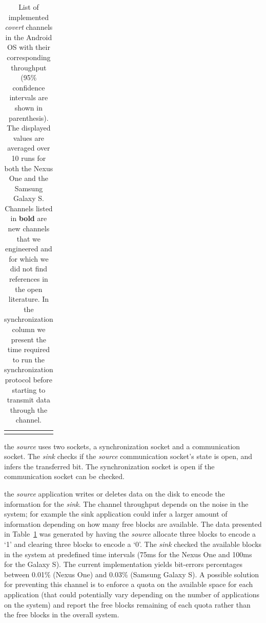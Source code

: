 \begin{landscape}
\begin{table}[!ht]
{\begin{tabular}{|l|rl|rl|rl|rl|}
      \multicolumn{9}{l}{} %
    \end{tabular}}

  \caption[List of implemented \emph{covert} channels in the
    Android OS with their corresponding throughput]{List of implemented \emph{covert} channels in the
    Android OS with their corresponding throughput (95\% confidence
    intervals are shown in parenthesis). The displayed values are averaged over 10 runs
    for both the Nexus One and the Samsung Galaxy S. Channels listed
    in \textbf{bold} are new channels that we engineered and for which
    we did not find references in the open literature. In the
    synchronization column we present the time required to run the
    synchronization protocol before starting to transmit data through
    the channel.}
  \label{tab:sp_appcollusion_covert-channels}
\end{table}
\end{landscape}

 the \emph{source} uses two
sockets, a synchronization socket and a communication socket. The
\emph{sink} checks if the \emph{source} communication socket's state
is open, and infers the transferred bit. The synchronization socket is
open if the communication socket can be checked.

 the \emph{source} application
writes or deletes data on the disk to encode the information for the
\emph{sink}. The channel throughput depends on the noise in the
system; for example the sink application could infer a larger amount
of information depending on how many free blocks are available. The
data presented in Table~\ref{tab:sp_appcollusion_covert-channels} was generated by
having the \emph{source} allocate three blocks to encode a `1' and
clearing three blocks to encode a `0'. The \emph{sink} checked the
available blocks in the system at predefined time intervals (75ms for
the Nexus One and 100ms for the Galaxy S). The current implementation
yields bit-errors percentages between 0.01\% (Nexus One) and 0.03\%
(Samsung Galaxy S). A possible solution for preventing this channel is
to enforce a quota on the available space for each application (that
could potentially vary depending on the number of applications on the
system) and report the free blocks remaining of each quota rather than
the free blocks in the overall system.

